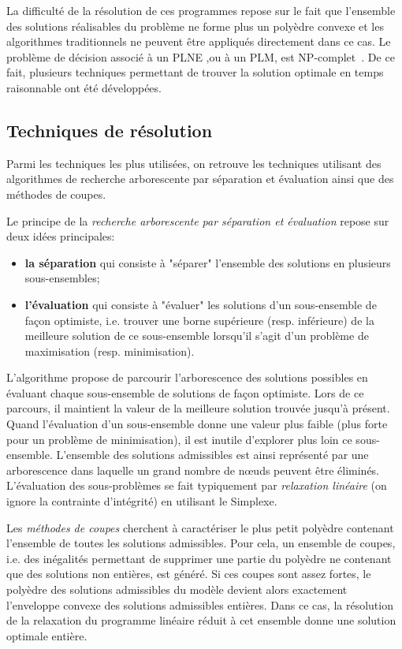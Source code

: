 La difficulté de la résolution de ces programmes repose sur le fait
que l'ensemble des solutions réalisables du problème ne forme plus un
polyèdre convexe et les algorithmes traditionnels ne peuvent être
appliqués directement dans ce cas. Le problème de décision associé à
un PLNE ,ou à un PLM, est NP-complet~\cite{NP_bible}. De ce fait,
plusieurs techniques permettant de trouver la solution optimale en
temps raisonnable ont été développées.

\subsection{Techniques de résolution}

Parmi les techniques les plus utilisées, on retrouve les techniques
utilisant des algorithmes de recherche arborescente par séparation et
évaluation ainsi que des méthodes de coupes.

Le principe de la {\it recherche arborescente par séparation et
évaluation} repose sur deux idées principales: 
\begin{itemize}
\item {\bf la séparation} qui consiste à "séparer" l'ensemble des
solutions en plusieurs sous-ensembles; 
\item {\bf l'évaluation} qui
consiste à "évaluer" les solutions d'un sous-ensemble de façon
optimiste, i.e. trouver une borne supérieure (resp. inférieure) de 
la meilleure solution de ce sous-ensemble lorsqu'il s'agit d'un
problème de maximisation (resp. minimisation).
\end{itemize} L’algorithme propose de parcourir l’arborescence des
solutions possibles en évaluant chaque sous-ensemble de solutions de
façon optimiste. Lors de ce parcours, il maintient la valeur de la
meilleure solution trouvée jusqu’à présent. Quand l’évaluation d’un
sous-ensemble donne une valeur plus faible (plus forte pour un
problème de minimisation), il est inutile d’explorer
plus loin ce sous-ensemble. L’ensemble des solutions admissibles est
ainsi représenté par une arborescence dans laquelle un grand nombre de
nœuds peuvent être éliminés. L’évaluation des sous-problèmes se fait
typiquement par {\it relaxation linéaire} (on ignore la contrainte
d’intégrité) en utilisant le Simplexe.

Les {\it méthodes de coupes} cherchent à caractériser le plus petit
polyèdre contenant l'ensemble de toutes les solutions
admissibles. Pour cela, un ensemble de coupes, i.e. des inégalités
permettant de supprimer une partie du polyèdre ne contenant que des
solutions non entières, est généré. Si ces coupes sont assez fortes,
le polyèdre des solutions admissibles du modèle devient alors
exactement l'enveloppe convexe des solutions admissibles
entières. Dans ce cas, la résolution de la relaxation du programme
linéaire  réduit à cet ensemble donne une solution optimale
entière.

